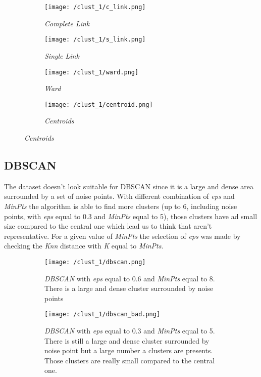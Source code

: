 \documentclass{article}
\begin{document}
\begin{figure}[h!]
    \centering
    \begin{subfigure}{0.49\textwidth}
        \centering
        \texttt{[image: /clust\_1/c\_link.png]}
        \caption{\emph{Complete Link}}
        \label{fig:clink_img}
    \end{subfigure}
    \begin{subfigure}{0.49\textwidth}
        \centering
        \texttt{[image: /clust\_1/s\_link.png]}
        \caption{\emph{Single Link}}
        \label{fig:slink_img}
    \end{subfigure}
    \begin{subfigure}{0.49\textwidth}
        \centering
        \texttt{[image: /clust\_1/ward.png]}
        \caption{\emph{Ward}}
        \label{fig:ward_img}
    \end{subfigure}
    \begin{subfigure}{0.49\textwidth}
         \centering
         \texttt{[image: /clust\_1/centroid.png]}
         \caption{\emph{Centroids}}
         \label{fig:centr_img}
     \end{subfigure}
    \label{fig:dendograms}
\end{figure}

\subsection{DBSCAN}
The dataset doesn't look suitable for DBSCAN since it is a large and dense area surrounded by a set of noise points. With different combination of \emph{eps} and \emph{MinPts} the algorithm is able to find more clusters (up to 6, including noise points, with \emph{eps} equal to 0.3 and \emph{MinPts} equal to 5), those clusters have ad small size compared to the central one which lead us to think that aren't representative. For a given value of \emph{MinPts} the selection of \emph{eps} was made by checking the \emph{Knn} distance with \emph{K} equal to \emph{MinPts}.

\begin{figure}[ht]
    \centering
    \begin{subfigure}{0.46\paperwidth}
        \centering
        \texttt{[image: /clust\_1/dbscan.png]}
        \caption{\emph{DBSCAN} with \emph{eps} equal to 0.6 and \emph{MinPts} equal to 8. There is a large and dense cluster surrounded by noise points}
        \label{fig:dbscan_good}
    \end{subfigure}
    \begin{subfigure}{0.45\paperwidth}
        \centering
        \texttt{[image: /clust\_1/dbscan\_bad.png]}
        \caption{\emph{DBSCAN} with \emph{eps} equal to 0.3 and \emph{MinPts} equal to 5. There is still a large and dense cluster surrounded by noise point but a large number a clusters are presents. Those clusters are really small compared to the central one.}
        \label{fig:dbscan_bad}
    \end{subfigure}
    \caption{}
    \label{fig:dbscan}
\end{figure}
\end{document}
